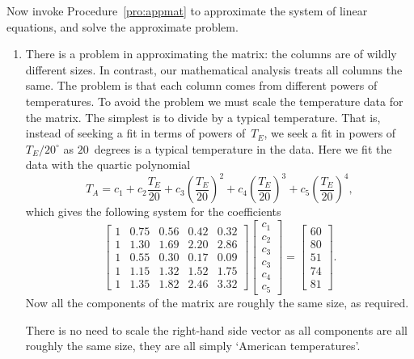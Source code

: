 \begin{example}
\begin{solution}
Now invoke Procedure~\ref{pro:appmat} to approximate the system of linear equations, and solve the approximate problem.
\begin{enumerate}
\item
There is a problem in approximating the matrix: the columns are of wildly different sizes.  
In contrast, our mathematical analysis treats all columns the same.  
The problem is that each column comes from different powers of temperatures.  
To avoid the problem we must scale the temperature data for the matrix.  
The simplest is to divide by a typical temperature.
That is, instead of seeking a fit in terms of powers of~\(T_E\), we seek a fit in powers of~\(T_E/20^\circ\) as \(20\)~degrees is a typical temperature in the data.
Here we fit the data with the quartic polynomial
\begin{equation*}
T_A=c_1+c_2\frac{T_E}{20} +c_3\left(\frac{T_E}{20}\right)^2+c_4\left(\frac{T_E}{20}\right)^3+c_5\left(\frac{T_E}{20}\right)^4,
\end{equation*}
which gives the following system for the coefficients \twodp
\begin{equation*}
\begin{bmatrix} 1&0.75&0.56&0.42&0.32
\\1&1.30&1.69&2.20&2.86
\\1&0.55&0.30&0.17&0.09
\\1&1.15&1.32&1.52&1.75
\\1&1.35&1.82&2.46&3.32 \end{bmatrix}
\begin{bmatrix} c_1\\c_2\\c_3\\c_3\\c_4\\c_5 \end{bmatrix}
=\begin{bmatrix} 60\\80\\51\\74\\81 \end{bmatrix}.
\end{equation*}
Now all the components of the matrix are roughly the same size, as required.

There is no need to scale the right-hand side vector as all components are all roughly the same size, they are all simply `American temperatures'. 


\end{enumerate}
\end{solution}
\end{example}
